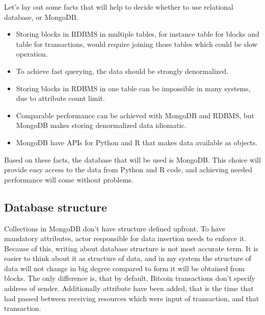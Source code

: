 \documentclass[12pt, en, eng, oneside]{mgr}
\begin{document}
Let's lay out some facts that will help to decide whether to use relational database, or MongoDB.

\begin{itemize}
\item 
Storing blocks in RDBMS in multiple tables, for instance table for blocks and table for transactions, would require joining those tables which could be slow operation.
\item 
To achieve fast querying, the data should be strongly denormalized.
\item
Storing blocks in RDBMS in one table can be impossible in many systems, due to attribute count limit.
\item 
Comparable performance can be achieved with MongoDB and RDBMS, but MongoDB makes storing denormalized data idiomatic.
\item
MongoDB have APIs for Python and R that makes data available as objects.
\end{itemize}

Based on these facts, the database that will be used is MongoDB. This choice will provide easy access to the data from Python and R code, and achieving needed performance will come without problems.


\subsection{Database structure}
 
Collections in MongoDB don't have structure defined upfront. To have mandatory attributes, actor responsible for data insertion needs to enforce it. Because of this, writing about database structure is not most accurate term. It is easier to think about it as structure of data, and in my system the structure of data will not change in big degree compared to form it will be obtained from blocks. The only difference is, that by default, Bitcoin transactions don't specify address of sender. Additionally attribute have been added, that is the time that had passed between receiving resources which were input of transaction, and that transaction.
\end{document}
